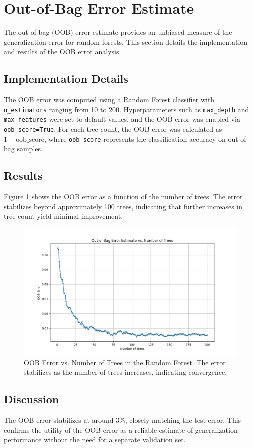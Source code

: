 \documentclass[12pt]{article}
\begin{document}
\section{Out-of-Bag Error Estimate}
The out-of-bag (OOB) error estimate provides an unbiased measure of the generalization error for random forests. This section details the implementation and results of the OOB error analysis.

\subsection*{Implementation Details}
The OOB error was computed using a Random Forest classifier with \texttt{n\_estimators} ranging from 10 to 200. Hyperparameters such as \texttt{max\_depth} and \texttt{max\_features} were set to default values, and the OOB error was enabled via \texttt{oob\_score=True}. For each tree count, the OOB error was calculated as \( 1 - \text{oob\_score} \), where \texttt{oob\_score} represents the classification accuracy on out-of-bag samples.

\subsection*{Results}
Figure \ref{fig:oob_error} shows the OOB error as a function of the number of trees. The error stabilizes beyond approximately 100 trees, indicating that further increases in tree count yield minimal improvement.

\begin{figure}[h!]
    \centering
    \includegraphics[width=0.8\linewidth]{figures/OOB_error.png}
    \caption{OOB Error vs. Number of Trees in the Random Forest. The error stabilizes as the number of trees increases, indicating convergence.}
    \label{fig:oob_error}
\end{figure}

\subsection*{Discussion}
The OOB error stabilizes at around 3\%, closely matching the test error. This confirms the utility of the OOB error as a reliable estimate of generalization performance without the need for a separate validation set.
\end{document}
